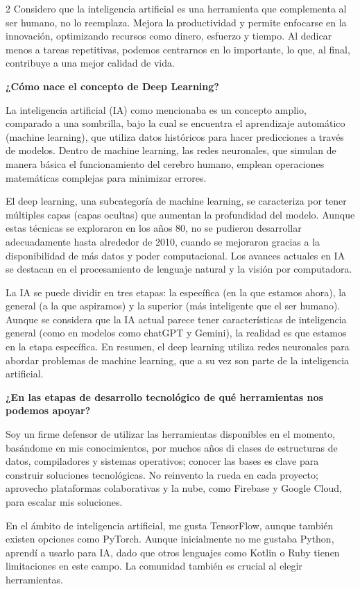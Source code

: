 \documentclass[12pt,spanish,Letterpaper,openany]{book}
\begin{document}
\begin {multicols}{2}
Considero que la inteligencia artificial es una herramienta que complementa al ser humano, no lo reemplaza. Mejora la productividad y permite enfocarse en la innovación, optimizando recursos como dinero, esfuerzo y tiempo. Al dedicar menos a tareas repetitivas, podemos centrarnos en lo importante, lo que, al final, contribuye a una mejor calidad de vida.

\textbf{¿Cómo nace el concepto de Deep Learning?}

La inteligencia artificial (IA) como mencionaba es un concepto amplio, comparado a una sombrilla, bajo la cual se encuentra el aprendizaje automático (machine learning), que utiliza datos históricos para hacer predicciones a través de modelos. Dentro de machine learning, las redes neuronales, que simulan de manera básica el funcionamiento del cerebro humano, emplean operaciones matemáticas complejas para minimizar errores.

El deep learning, una subcategoría de machine learning, se caracteriza por tener múltiples capas (capas ocultas) que aumentan la profundidad del modelo. Aunque estas técnicas se exploraron en los años 80, no se pudieron desarrollar adecuadamente hasta alrededor de 2010, cuando se mejoraron gracias a la disponibilidad de más datos y poder computacional. Los avances actuales en IA se destacan en el procesamiento de lenguaje natural y la visión por computadora.

La IA se puede dividir en tres etapas: la específica (en la que estamos ahora), la general (a la que aspiramos) y la superior (más inteligente que el ser humano). Aunque se considera que la IA actual parece tener características de inteligencia general (como en modelos como chatGPT y Gemini), la realidad es que estamos en la etapa específica. En resumen, el deep learning utiliza redes neuronales para abordar problemas de machine learning, que a su vez son parte de la inteligencia artificial.

\textbf{¿En las etapas de desarrollo tecnológico de qué herramientas nos podemos apoyar?}

Soy un firme defensor de utilizar las herramientas disponibles en el momento, basándome en mis conocimientos, por muchos años di clases de estructuras de datos, compiladores y sistemas operativos; conocer las bases es clave para construir soluciones tecnológicas. No reinvento la rueda en cada proyecto; aprovecho plataformas colaborativas y la nube, como Firebase y Google Cloud, para escalar mis soluciones.

En el ámbito de inteligencia artificial, me gusta TensorFlow, aunque también existen opciones como PyTorch. Aunque inicialmente no me gustaba Python, aprendí a usarlo para IA, dado que otros lenguajes como Kotlin o Ruby tienen limitaciones en este campo. La comunidad también es crucial al elegir herramientas.


\end{multicols}
\end{document}
